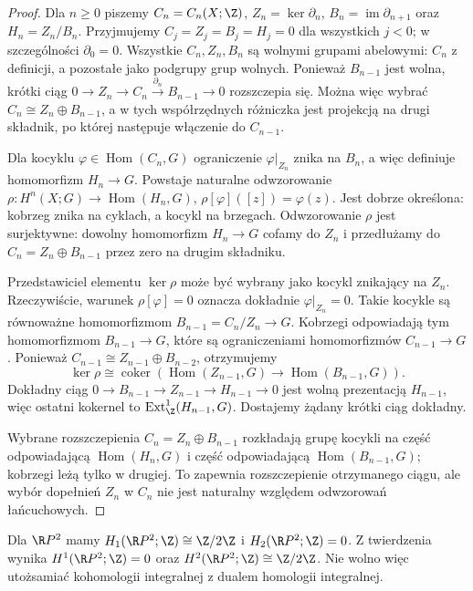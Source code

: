 \begin{proof}
Dla $n\geq0$ piszemy $C_n=C_n(X;\Z)$,
$Z_n=\ker\partial_n$, $B_n=\operatorname{im}\partial_{n+1}$ oraz
$H_n=Z_n/B_n$. Przyjmujemy $C_j=Z_j=B_j=H_j=0$
dla wszystkich $j<0$; w szczególności $\partial_0=0$.
Wszystkie $C_n,Z_n,B_n$ są wolnymi grupami
abelowymi: $C_n$ z definicji, a pozostałe jako podgrupy
grup wolnych. Ponieważ $B_{n-1}$ jest wolna, krótki ciąg
$0\to Z_n\to C_n\xrightarrow{\partial_n}B_{n-1}\to0$
rozszczepia się. Można więc wybrać
$C_n\cong Z_n\oplus B_{n-1}$, a w tych współrzędnych
różniczka jest projekcją na drugi składnik, po której
następuje włączenie do $C_{n-1}$.

Dla kocyklu $\varphi\in\operatorname{Hom}(C_n,G)$ ograniczenie
$\varphi|_{Z_n}$ znika na $B_n$, a więc definiuje
homomorfizm $H_n\to G$. Powstaje naturalne odwzorowanie
$\rho:H^n(X;G)\to\operatorname{Hom}(H_n,G)$,
$\rho[\varphi]([z])=\varphi(z)$. Jest dobrze określona:
kobrzeg znika na cyklach, a kocykl na brzegach.
Odwzorowanie $\rho$ jest surjektywne: dowolny homomorfizm
$H_n\to G$ cofamy do $Z_n$ i przedłużamy do
$C_n=Z_n\oplus B_{n-1}$ przez zero na drugim składniku.

Przedstawiciel elementu $\ker\rho$ może być wybrany
jako kocykl znikający na $Z_n$. Rzeczywiście, warunek
$\rho[\varphi]=0$ oznacza dokładnie $\varphi|_{Z_n}=0$.
Takie kocykle są równoważne homomorfizmom
$B_{n-1}=C_n/Z_n\to G$. Kobrzegi odpowiadają tym
homomorfizmom $B_{n-1}\to G$, które są ograniczeniami
homomorfizmów $C_{n-1}\to G$. Ponieważ
$C_{n-1}\cong Z_{n-1}\oplus B_{n-2}$, otrzymujemy
\[
\ker\rho\cong
\operatorname{coker}\!\left(
\operatorname{Hom}(Z_{n-1},G)\longrightarrow
\operatorname{Hom}(B_{n-1},G)\right).
\]
Dokładny ciąg
$0\to B_{n-1}\to Z_{n-1}\to H_{n-1}\to0$
jest wolną prezentacją $H_{n-1}$, więc ostatni
kokernel to $\operatorname{Ext}^1_{\Z}(H_{n-1},G)$.
Dostajemy żądany krótki ciąg dokładny.

Wybrane rozszczepienia $C_n=Z_n\oplus B_{n-1}$
rozkładają grupę kocykli na część odpowiadającą
$\operatorname{Hom}(H_n,G)$ i część odpowiadającą
$\operatorname{Hom}(B_{n-1},G)$; kobrzegi leżą tylko
w drugiej. To zapewnia rozszczepienie otrzymanego
ciągu, ale wybór dopełnień $Z_n$ w $C_n$ nie jest
naturalny względem odwzorowań łańcuchowych.
\end{proof}

\begin{przyklad}
Dla $\R P^2$ mamy $H_1(\R P^2;\Z)\cong\Z/2\Z$
i $H_2(\R P^2;\Z)=0$. Z twierdzenia wynika
$H^1(\R P^2;\Z)=0$ oraz
$H^2(\R P^2;\Z)\cong\Z/2\Z$.
Nie wolno więc utożsamiać kohomologii integralnej
z dualem homologii integralnej.
\end{przyklad}

